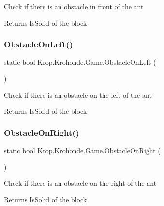 Check if there is an obstacle in front of the ant 

\begin{DoxyReturn}{Returns}
Is\+Solid of the block
\end{DoxyReturn}
\mbox{\label{class_krop_1_1_krohonde_1_1_game_a6bca313b39a9effdc456b6a31f5af50f}} 
\subsubsection{\texorpdfstring{Obstacle\+On\+Left()}{ObstacleOnLeft()}}
{\footnotesize\ttfamily static bool Krop.\+Krohonde.\+Game.\+Obstacle\+On\+Left (\begin{DoxyParamCaption}{ }\end{DoxyParamCaption})\hspace{0.3cm}{\ttfamily [static]}}



Check if there is an obstacle on the left of the ant 

\begin{DoxyReturn}{Returns}
Is\+Solid of the block
\end{DoxyReturn}
\mbox{\label{class_krop_1_1_krohonde_1_1_game_a7a4f81955b1da1871586ee8f311cc20e}} 
\subsubsection{\texorpdfstring{Obstacle\+On\+Right()}{ObstacleOnRight()}}
{\footnotesize\ttfamily static bool Krop.\+Krohonde.\+Game.\+Obstacle\+On\+Right (\begin{DoxyParamCaption}{ }\end{DoxyParamCaption})\hspace{0.3cm}{\ttfamily [static]}}



Check if there is an obstacle on the right of the ant 

\begin{DoxyReturn}{Returns}
Is\+Solid of the block
\end{DoxyReturn}
\mbox{\label{class_krop_1_1_krohonde_1_1_game_ae417ed79f31ff0280ca92ec3202990e3}} 

